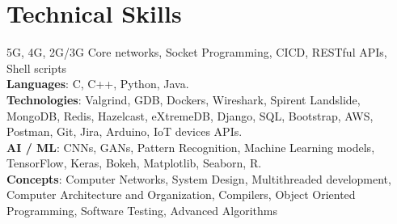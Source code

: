 \section{Technical Skills}
    \begin{itemize}[leftmargin=0.15in, label={}]
	\small{\item{
 5G, 4G, 2G/3G Core networks, Socket Programming, CICD, RESTful APIs, Shell scripts \\
		\textbf{Languages}{: C, C++, Python, Java.} \\
		\textbf{Technologies}{: Valgrind, GDB, Dockers, Wireshark, Spirent Landslide, MongoDB, Redis, Hazelcast, eXtremeDB, Django, SQL, Bootstrap, AWS, Postman, Git, Jira, Arduino, IoT devices APIs.} \\
            \textbf{AI / ML}{: CNNs, GANs, Pattern Recognition, Machine Learning models, TensorFlow, Keras, Bokeh, Matplotlib, Seaborn, R.} \\
		\textbf{Concepts}{: Computer Networks, System Design, Multithreaded development, Computer Architecture and Organization, Compilers, Object Oriented Programming, Software Testing, Advanced Algorithms}
	}}
    \end{itemize}